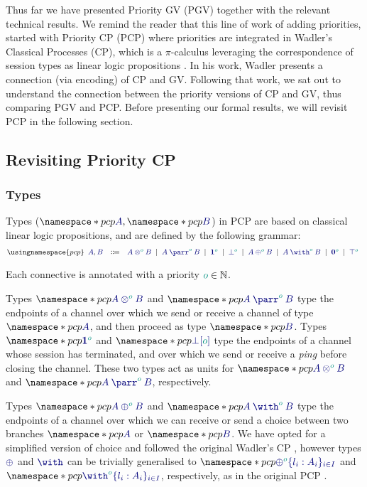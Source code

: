 Thus far we have presented Priority GV (PGV) together with the relevant technical results. We remind the reader that this line of work of adding priorities, started with Priority CP (PCP) \cite{dardhagay18} where priorities are integrated in Wadler's Classical Processes (CP), which is a $\pi$-calculus leveraging the correspondence of session types as linear logic propositions \cite{wadler12}.
In his work, Wadler presents a connection (via encoding) of CP and GV. Following that work, we sat out to understand the connection between the priority versions of CP and GV, thus comparing PGV and PCP.
Before presenting our formal results, we will revisit PCP in the following section.

\begingroup
{}
\subsection{Revisiting Priority CP}
\label{app:revisiting-PCP}

\subsubsection*{Types}
Types ($\pcp{\ty{A}}, \pcp{\ty{B}}$) in PCP are based on classical linear logic propositions, and are defined by the following grammar:
\[
  \usingnamespace{pcp}
  \begin{array}{lcl}
    \ty{A}, \ty{B}
    & \Coloneqq & \ty{\tytens[\cs{o}]{A}{B}}
      \sep        \ty{\typarr[\cs{o}]{A}{B}}
      \sep        \ty{\tyone[\cs{o}]}
      \sep        \ty{\tybot[\cs{o}]}
      \sep        \ty{\typlus[\cs{o}]{A}{B}}
      \sep        \ty{\tywith[\cs{o}]{A}{B}}
      \sep        \ty{\tynil[\cs{o}]}
      \sep        \ty{\tytop[\cs{o}]}
  \end{array}
\]

Each connective is annotated with a priority $\cs{o}\in\mathbb{N}$.

Types $\pcp{\ty{\tytens[\cs{o}]{A}{B}}}$ and $\pcp{\ty{\typarr[\cs{o}]{A}{B}}}$ type the endpoints of a channel over which we send or receive a channel of type $\pcp{\ty{A}}$, and then proceed as type $\pcp{\ty{B}}$. Types $\pcp{\ty{\tyone[\cs{o}]}}$ and $\pcp{\ty{{\tybot}[\cs{o}]}}$ type the endpoints of a channel whose session has terminated, and over which we send or receive a \emph{ping} before closing the channel. These two types act as units for $\pcp{\ty{\tytens[\cs{o}]{A}{B}}}$ and $\pcp{\ty{\typarr[\cs{o}]{A}{B}}}$, respectively.

Types $\pcp{\ty{\typlus[\cs{o}]{A}{B}}}$ and $\pcp{\ty{\tywith[\cs{o}]{A}{B}}}$ type the endpoints of a channel over which we can receive or send a choice between two branches $\pcp{\ty{A}}$ or $\pcp{\ty{B}}$. We have opted for a simplified version of choice and followed the original Wadler's CP \cite{wadler14}, however types $\ty{\oplus}$ and $\ty{\with}$ can be trivially generalised to $\pcp{\ty{\oplus^{\cs{o}}\{l_i:A_i\}_{i\in I}}}$ and $\pcp{\ty{\with^{\cs{o}}\{l_i:A_i\}_{i\in I}}}$, respectively, as in the original PCP \cite{dardhagay18extended}.


